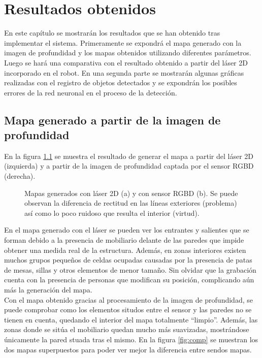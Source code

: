 \chapter{Resultados obtenidos} \label{chapter.resultados}

En este capítulo se mostrarán los resultados que se han obtenido tras implementar el sistema. Primeramente se expondrá el mapa generado con la imagen de profundidad y los mapas obtenidos utilizando diferentes parámetros. Luego se hará una comparativa con el resultado obtenido a partir del láser 2D incorporado en el robot. En una segunda parte se mostrarán algunas gráficas realizadas con el registro de objetos detectados y se expondrán los posibles errores de la red neuronal en el proceso de la detección.\\

\section{Mapa generado a partir de la imagen de profundidad}

En la figura \ref{fig:res_mapas} se muestra el resultado de generar el mapa a partir del láser 2D (izquierda) y a partir de la imagen de profundidad captada por el sensor RGBD (derecha).\\

\begin{figure}[h]
 \centering
 \caption{Mapas generados con láser 2D (a) y con sensor RGBD (b). Se puede observan la diferencia de rectitud en las líneas exteriores (problema) así como lo poco ruidoso que resulta el interior (virtud).}
 \label{fig:res_mapas}
\end{figure}

En el mapa generado con el láser se pueden ver los entrantes y salientes que se forman debido a la presencia de mobiliario delante de las paredes que impide obtener una medida real de la estructura. Además, en zonas interiores existen muchos grupos pequeños de celdas ocupadas causadas por la presencia de patas de mesas, sillas y otros elementos de menor tamaño. Sin olvidar que la grabación cuenta con la presencia de personas que modifican su posición, complicando aún más la generación del mapa.\\

Con el mapa obtenido gracias al procesamiento de la imagen de profundidad, se puede comprobar como los elementos situdos entre el sensor y las paredes no se tienen en cuenta, quedando el interior del mapa totalmente ``limpio''. Además, las zonas donde se sitúa el mobiliario quedan mucho más suavizadas, mostrándose únicamente la pared stuada tras el mismo. En la figura \ref{fig:comp} se muestran los dos mapas superpuestos para poder ver mejor la diferencia entre sendos mapas.\\


